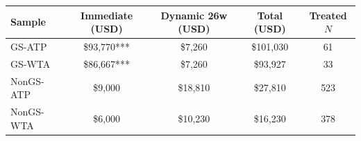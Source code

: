 \begin{tabular}{l cccc}
\toprule
Sample & Immediate (USD) & Dynamic 26w (USD) & Total (USD) & Treated $N$ \\
\midrule
GS-ATP & \$93,770*** & \$7,260 & \$101,030 & 61 \\
GS-WTA & \$86,667*** & \$7,260 & \$93,927 & 33 \\
NonGS-ATP & \$9,000 & \$18,810 & \$27,810 & 523 \\
NonGS-WTA & \$6,000 & \$10,230 & \$16,230 & 378 \\
\bottomrule
\end{tabular}
